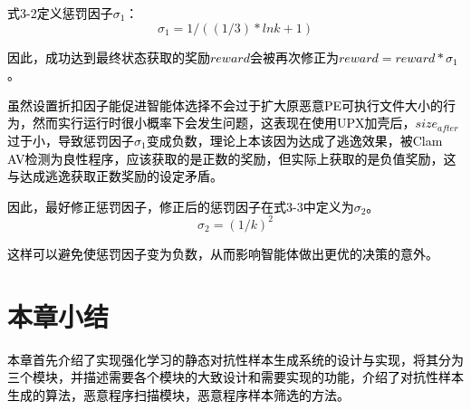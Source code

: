 \textcolor{black}{式3-2定义惩罚因子$\sigma_{1}$：}
\begin{equation}
    \sigma_{1}=1/((1/3)*lnk+1)
\end{equation}

\textcolor{black}{因此，成功达到最终状态获取的奖励$reward$会被再次修正为$reward=reward*\sigma_{1}$。}

\textcolor{black}{虽然设置折扣因子能促进智能体选择不会过于扩大原恶意PE可执行文件大小的行为，然而实行运行时很小概率下会发生问题，这表现在使用UPX加壳后，$size_{after}$过于小，导致惩罚因子$\sigma_{1}$变成负数，理论上本该因为达成了逃逸效果，被Clam AV检测为良性程序，应该获取的是正数的奖励，但实际上获取的是负值奖励，这与达成逃逸获取正数奖励的设定矛盾。}

\textcolor{black}{因此，最好修正惩罚因子，修正后的惩罚因子在式3-3中定义为$\sigma_{2}$。}
\begin{equation}
    \sigma_2=(1/k)^2
\end{equation}

\textcolor{black}{这样可以避免使惩罚因子变为负数，从而影响智能体做出更优的决策的意外。}

\section{本章小结}

\textcolor{black}{本章首先介绍了实现强化学习的静态对抗性样本生成系统的设计与实现，将其分为三个模块，并描述需要各个模块的大致设计和需要实现的功能，介绍了对抗性样本生成的算法，恶意程序扫描模块，恶意程序样本筛选的方法。}
